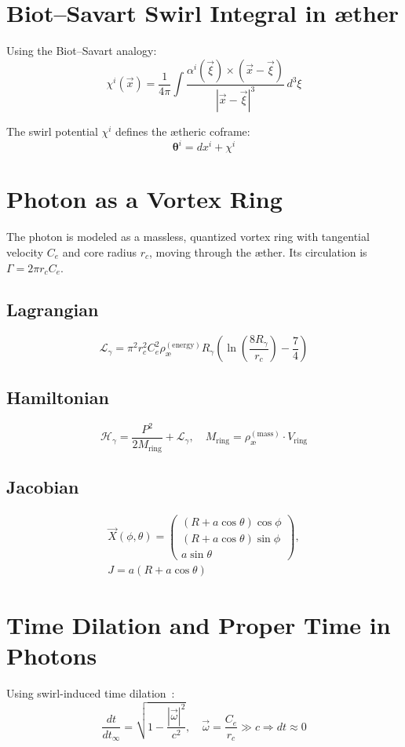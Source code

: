 \section{Biot--Savart Swirl Integral in \ae ther}\label{sec:biot-savart}

Using the Biot--Savart analogy:
\begin{equation}
    \chi^i(\vec{x}) = \frac{1}{4\pi} \int \frac{\alpha^i(\vec{\xi}) \times (\vec{x} - \vec{\xi})}{|\vec{x} - \vec{\xi}|^3} \, d^3\xi
\end{equation}

The swirl potential $\chi^i$ defines the \ae theric coframe:
\begin{equation}
    \boldsymbol{\theta}^i = dx^i + \chi^i
\end{equation}

\section{Photon as a Vortex Ring}

The photon is modeled as a massless, quantized vortex ring with tangential velocity $C_e$ and core radius $r_c$, moving through the \ae ther. Its circulation is $\Gamma = 2\pi r_c C_e$.

\subsection{Lagrangian}
\begin{equation}
    \mathcal{L}_\gamma = \pi^2 r_c^2 C_e^2 \rho_\text{\ae}^{(\text{energy})} R_\gamma \left( \ln\left( \frac{8R_\gamma}{r_c} \right) - \frac{7}{4} \right)
\end{equation}

\subsection{Hamiltonian}
\begin{equation}
    \mathcal{H}_\gamma = \frac{P^2}{2M_{\text{ring}}} + \mathcal{L}_\gamma, \quad M_{\text{ring}} = \rho_\text{\ae}^{(\text{mass})} \cdot V_{\text{ring}}
\end{equation}

\subsection{Jacobian}
\begin{align}
    \vec{X}(\phi,\theta) =
    \begin{pmatrix}
    (R + a\cos\theta)\cos\phi \\
    (R + a\cos\theta)\sin\phi \\
    a\sin\theta
    \end{pmatrix}, \\
    J = a(R + a\cos\theta)
\end{align}


\section{Time Dilation and Proper Time in Photons}

Using swirl-induced time dilation~\cite{VAM-1}:
\begin{equation}
    \frac{dt}{dt_\infty} = \sqrt{1 - \frac{|\vec{\omega}|^2}{c^2}}, \quad \vec{\omega} = \frac{C_e}{r_c} \gg c \Rightarrow dt \approx 0
\end{equation}